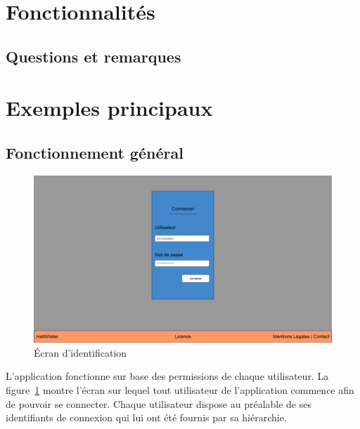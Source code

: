 \documentclass[a4paper, 11pt]{article}
\begin{document}
\section{Fonctionnalités}
  \subsection{Questions et remarques}
\section{Exemples principaux}
  \subsection{Fonctionnement général}
    \begin{figure}[H]
        \includegraphics[width=\textwidth]{Cahier_des_Charges/login}
        \caption{\'Ecran d'identification}
        \label{fig:login}
    \end{figure}

    L'application fonctionne sur base des permissions de chaque utilisateur. La figure~\ref{fig:login} montre l'écran sur lequel tout utilisateur de l'application commence afin de pouvoir se connecter. Chaque utilisateur dispose au préalable de ses identifiants de connexion qui lui ont été fournis par sa hiérarchie.
\end{document}
